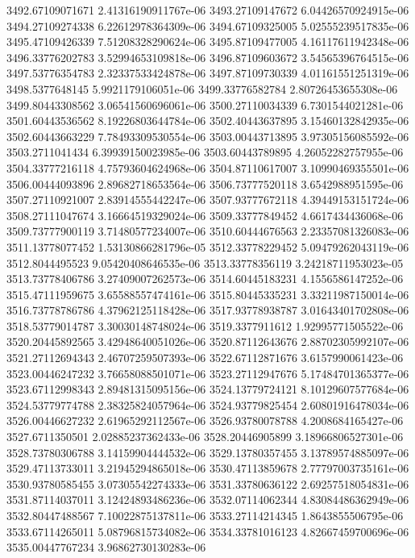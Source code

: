 {3492.67109071671 2.41316190911767e-06
3493.27109147672 6.04426570924915e-06
3494.27109274338 6.22612978364309e-06
3494.67109325005 5.02555239517835e-06
3495.47109426339 7.51208328290624e-06
3495.87109477005 4.16117611942348e-06
3496.33776202783 3.52994653109818e-06
3496.87109603672 3.54565396764515e-06
3497.53776354783 2.32337533424878e-06
3497.87109730339 4.01161551251319e-06
3498.5377648145 5.9921179106051e-06
3499.33776582784 2.80726453655308e-06
3499.80443308562 3.06541560696061e-06
3500.27110034339 6.7301544021281e-06
3501.60443536562 8.19226803644784e-06
3502.40443637895 3.15460132842935e-06
3502.60443663229 7.78493309530554e-06
3503.00443713895 3.97305156085592e-06
3503.2711041434 6.39939150023985e-06
3503.60443789895 4.26052282757955e-06
3504.33777216118 4.75793604624968e-06
3504.87110617007 3.10990469355501e-06
3506.00444093896 2.89682718653564e-06
3506.73777520118 3.6542988951595e-06
3507.27110921007 2.83914555442247e-06
3507.93777672118 4.39449153151724e-06
3508.27111047674 3.16664519329024e-06
3509.33777849452 4.6617434436068e-06
3509.73777900119 3.71480577234007e-06
3510.60444676563 2.23357081326083e-06
3511.13778077452 1.53130866281796e-05
3512.33778229452 5.09479262043119e-06
3512.8044495523 9.05420408646535e-06
3513.33778356119 3.24218711953023e-05
3513.73778406786 3.27409007262573e-06
3514.60445183231 4.1556586147252e-06
3515.47111959675 3.65588557474161e-06
3515.80445335231 3.33211987150014e-06
3516.73778786786 4.37962125118428e-06
3517.93778938787 3.01643401702808e-06
3518.53779014787 3.30030148748024e-06
3519.3377911612 1.92995771505522e-06
3520.20445892565 3.42948640051026e-06
3520.87112643676 2.88702305992107e-06
3521.27112694343 2.46707259507393e-06
3522.67112871676 3.6157990061423e-06
3523.00446247232 3.76658088501071e-06
3523.27112947676 5.17484701365377e-06
3523.67112998343 2.89481315095156e-06
3524.13779724121 8.10129607577684e-06
3524.53779774788 2.38325824057964e-06
3524.93779825454 2.60801916478034e-06
3526.00446627232 2.61965292112567e-06
3526.93780078788 4.2008684165427e-06
3527.6711350501 2.02885237362433e-06
3528.20446905899 3.18966806527301e-06
3528.73780306788 3.14159904444532e-06
3529.13780357455 3.13789574885097e-06
3529.47113733011 3.21945294865018e-06
3530.47113859678 2.77797003735161e-06
3530.93780585455 3.07305542274333e-06
3531.33780636122 2.69257518054831e-06
3531.87114037011 3.12424893486236e-06
3532.07114062344 4.83084486362949e-06
3532.80447488567 7.10022875137811e-06
3533.27114214345 1.8643855506795e-06
3533.67114265011 5.08796815734082e-06
3534.33781016123 4.82667459700696e-06
3535.00447767234 3.96862730130283e-06
}

